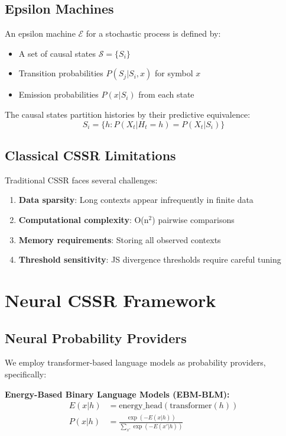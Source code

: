 \documentclass[12pt]{article}
\begin{document}
\subsection{Epsilon Machines}

An epsilon machine $\mathcal{E}$ for a stochastic process is defined by:
\begin{itemize}
    \item A set of causal states $\mathcal{S} = \{S_i\}$
    \item Transition probabilities $P(S_j|S_i, x)$ for symbol $x$
    \item Emission probabilities $P(x|S_i)$ from each state
\end{itemize}

The causal states partition histories by their predictive equivalence:
$$S_i = \{h : P(X_t|H_t = h) = P(X_t|S_i)\}$$

\subsection{Classical CSSR Limitations}

Traditional CSSR faces several challenges:
\begin{enumerate}
    \item \textbf{Data sparsity}: Long contexts appear infrequently in finite data
    \item \textbf{Computational complexity}: O(n$^2$) pairwise comparisons
    \item \textbf{Memory requirements}: Storing all observed contexts
    \item \textbf{Threshold sensitivity}: JS divergence thresholds require careful tuning
\end{enumerate}

\section{Neural CSSR Framework}

\subsection{Neural Probability Providers}

We employ transformer-based language models as probability providers, specifically:

\textbf{Energy-Based Binary Language Models (EBM-BLM):}
\begin{align}
E(x|h) &= \text{energy\_head}(\text{transformer}(h)) \\
P(x|h) &= \frac{\exp(-E(x|h))}{\sum_{x'} \exp(-E(x'|h))}
\end{align}
\end{document}
